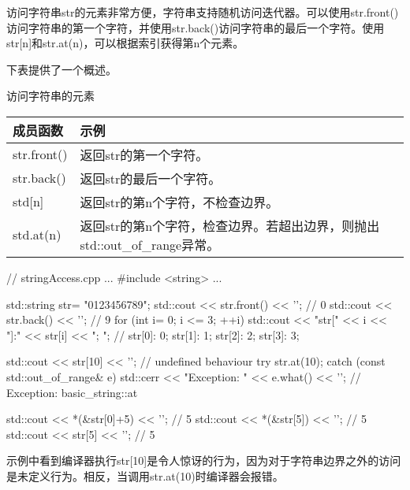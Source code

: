 访问字符串str的元素非常方便，字符串支持随机访问迭代器。可以使用str.front()访问字符串的第一个字符，并使用str.back()访问字符串的最后一个字符。使用str[n]和str.at(n)，可以根据索引获得第n个元素。

下表提供了一个概述。

\begin{center}
访问字符串的元素
\end{center}

\begin{longtable}[c]{|l|l|}
\hline
\textbf{成员函数} & \textbf{示例}                                                              \\ \hline
\endfirsthead
%
\endhead
%
str.front()               & 返回str的第一个字符。                                           \\ \hline
str.back()                & 返回str的最后一个字符。                                            \\ \hline
std{[}n{]}                & 返回str的第n个字符，不检查边界。 \\ \hline
std.at(n) & 返回str的第n个字符，检查边界。若超出边界，则抛出std::out\_of\_range异常。 \\ \hline
\end{longtable}


\begin{cpp}
// stringAccess.cpp
...
#include <string>
...

std::string str= {"0123456789"};
std::cout << str.front() << '\n'; // 0
std::cout << str.back() << '\n'; // 9
for (int i= 0; i <= 3; ++i){
	std::cout << "str[" << i << "]:" << str[i] << "; ";
} // str[0]: 0; str[1]: 1; str[2]: 2; str[3]: 3;

std::cout << str[10] << '\n'; // undefined behaviour
try{
	str.at(10);
}
catch (const std::out_of_range& e){
	std::cerr << "Exception: " << e.what() << '\n';
} // Exception: basic_string::at

std::cout << *(&str[0]+5) << '\n'; // 5
std::cout << *(&str[5]) << '\n'; // 5
std::cout << str[5] << '\n'; // 5
\end{cpp}

示例中看到编译器执行str[10]是令人惊讶的行为，因为对于字符串边界之外的访问是未定义行为。相反，当调用str.at(10)时编译器会报错。





























